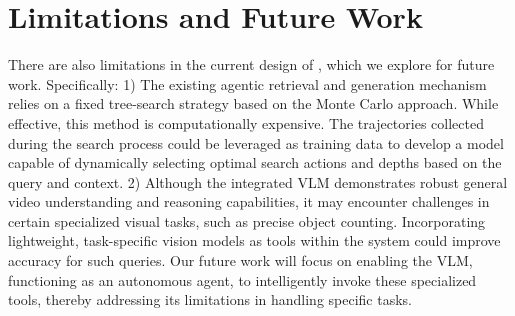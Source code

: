 \section{Limitations and Future Work}


There are also limitations in the current design of \sysname, which we explore for future work. Specifically: 1) The existing agentic retrieval and generation mechanism relies on a fixed tree-search strategy based on the Monte Carlo approach. While effective, this method is computationally expensive. The trajectories collected during the search process could be leveraged as training data to develop a model capable of dynamically selecting optimal search actions and depths based on the query and context. 2) Although the integrated VLM demonstrates robust general video understanding and reasoning capabilities, it may encounter challenges in certain specialized visual tasks, such as precise object counting. Incorporating lightweight, task-specific vision models as tools within the system could improve accuracy for such queries. Our future work will focus on enabling the VLM, functioning as an autonomous agent, to intelligently invoke these specialized tools, thereby addressing its limitations in handling specific tasks.



